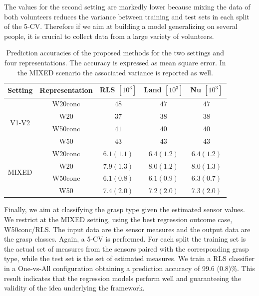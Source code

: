 The values for the second setting are markedly lower because mixing the data of both volunteers reduces the variance between training and test sets in each split of the 5-CV. Therefore if we aim at building a model generalizing on several people, it is crucial to collect data from a large variety of volunteers.\\
\begin{table}[h!]
\centering
\begin{tabular}{|c|c|c|c|c|}
\hline Setting & Representation  & RLS $[10^3]$ & Land $[10^3]$ & Nu $[10^3]$\\\hline
\multirow{4}{*}{V1-V2} & W20conc  & $48$ & $47$& $47$\\\cline{2-5}
&W20  	  & $37$ & $38$& $38$\\\cline{2-5}
&W50conc & $41$ & $40$& $40$\\\cline{2-5}
&W50 	  & $43$ & $43$& $43$\\\hline
\multirow{4}{*}{MIXED} 
& W20conc & $6.1 (1.1) $ & $6.4 (1.2) $& $6.4 (1.2) $\\\cline{2-5}
& W20 & $7.9 (1.3) $ & $8.0 (1.2) $& $8.0 (1.3) $\\\cline{2-5}
&  W50conc &   $6.1 (0.8) $ & $6.1 (0.9) $& $6.3 (0.7) $\\\cline{2-5}
& W50 & $7.4 (2.0) $ & $7.2 (2.0) $& $7.3 (2.0) $\\\hline
\end{tabular}
\caption{Prediction accuracies of the proposed methods for the two settings and four representations. The accuracy is expressed as 
mean square error. In the MIXED scenario the associated variance is reported as well.}
\label{tab:results}
\end{table}
Finally, we aim at classifying the grasp type given the estimated sensor values.
We restrict at the MIXED setting, using the best regression outcome case,  W50conc/RLS.
The input data are the sensor measures and the output data are the grasp classes.
Again, a 5-CV is performed. For each split the training set is the actual set of measures from the sensors paired with the corresponding
grasp type, while the test set is the set of estimated measures.  
We train a RLS classifier \cite{rifkin03rlsc} in a One-vs-All configuration 
 obtaining a prediction accuracy of 99.6 (0.8)\%. 
 This result indicates that the regression models perform well and 
 guaranteeing the validity of the idea underlying the framework.










